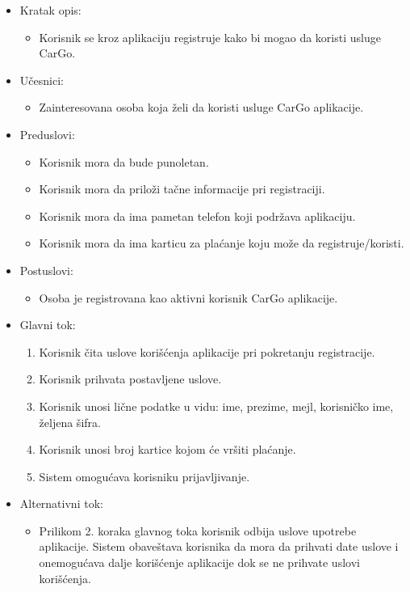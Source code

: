 \begin{itemize}
    \item Kratak opis:
        \begin{itemize}
            \item Korisnik se kroz aplikaciju registruje kako bi mogao da koristi usluge CarGo.
        \end{itemize}
    \item Učesnici:
        \begin{itemize}
            \item Zainteresovana osoba koja želi da koristi usluge CarGo aplikacije.
        \end{itemize}
    \item Preduslovi:
        \begin{itemize}
            \item Korisnik mora da bude punoletan.
            \item Korisnik mora da priloži tačne informacije pri registraciji.
            \item Korisnik mora da ima pametan telefon koji podržava aplikaciju.
            \item Korisnik mora da ima karticu za plaćanje koju može da registruje/koristi.
        \end{itemize}
    \item Postuslovi:
        \begin{itemize}
            \item Osoba je registrovana kao aktivni korisnik CarGo aplikacije.
        \end{itemize}
    \item Glavni tok:
        \begin{enumerate}
            \item Korisnik čita uslove korišćenja aplikacije pri pokretanju registracije.
            \item Korisnik prihvata postavljene uslove.
            \item Korisnik unosi lične podatke u vidu: ime, prezime, mejl, korisničko ime, željena šifra.
            \item Korisnik unosi broj kartice kojom će vršiti plaćanje.
            \item Sistem omogućava korisniku prijavljivanje.
        \end{enumerate}
    \item Alternativni tok:
        \begin{itemize}
            \item Prilikom 2. koraka glavnog toka korisnik odbija uslove upotrebe aplikacije. Sistem obaveštava korisnika da mora da prihvati date uslove i onemogućava dalje korišćenje aplikacije dok se ne prihvate uslovi korišćenja.

\end{itemize}
\end{itemize}
